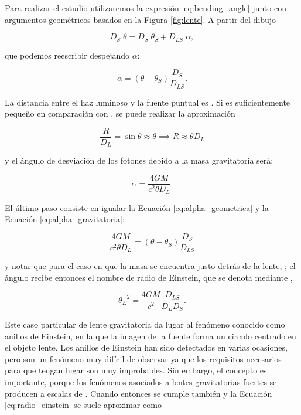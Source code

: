 \newpage

Para realizar el estudio utilizaremos la expresión \ref{eq:bending_angle} junto con argumentos geométricos basados en la Figura \ref{fig:lente}. A partir del dibujo

\begin{equation*}
    D_S\; \theta= D_S\;{\theta}_{S} + {D}_{LS}\;\alpha,
\end{equation*}

que podemos reescribir despejando $\alpha$: 

\begin{equation}\label{eq:alpha_geometrica}
    \alpha =(\theta -{\theta}_{S})\frac{{D}_{S}}{{D}_{LS}}.
\end{equation}

La distancia entre el haz luminoso y la fuente puntual es . Si  es suficientemente pequeño en comparación con , se puede realizar la aproximación

\begin{equation*}
    \frac{R}{{D}_{L}} = \sin{\theta} \approx \theta \implies R \approx \theta D_L
\end{equation*}

y el ángulo de desviación de los fotones debido a la masa gravitatoria será:

\begin{equation}\label{eq:alpha_gravitatoria}
    \alpha =\frac{4 GM}{{c}^{2}\theta {D}_{L}}.
\end{equation}

El último paso consiste en igualar la Ecuación \ref{eq:alpha_geometrica} y la Ecuación \ref{eq:alpha_gravitatoria}:

\begin{equation*}
     \frac{4 GM}{{c}^{2}\theta {D}_{L}}=(\theta -{\theta}_{S})\frac{{D}_{S}}{{D}_{LS}}
\end{equation*}

y notar que para el caso en que la masa se encuentra justo detrás de la lente, ; el ángulo \maths{\theta} recibe entonces el nombre de radio de Einstein, que se denota mediante ,

\begin{equation}\label{eq:radio_einstein}
    {{\theta}_{E}}^{2}=\frac{4 GM}{{c}^{2} }\frac{D_{LS}}{D_{L} D_{S}}.
\end{equation}

Este caso particular de lente gravitatoria da lugar al fenómeno conocido como anillos de Einstein, en la que la imagen de la fuente forma un circulo centrado en el objeto lente. Los anillos de Einstein han sido detectados en varias ocasiones, pero son un fenómeno muy difícil de observar ya que los requisitos necesarios para que tengan lugar son muy improbables. Sin embargo, el concepto es importante, porque los fenómenos asociados a lentes gravitatorias fuertes se producen a escalas de .
Cuando  entonces se cumple también  y la Ecuación \ref{eq:radio_einstein} se suele aproximar como

